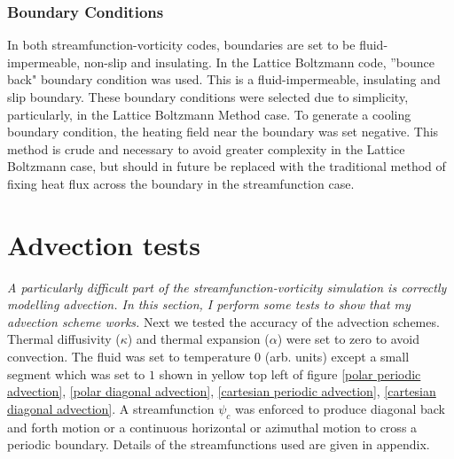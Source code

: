 \documentclass{article}
\begin{document}
\subsubsection*{Boundary Conditions}
In both streamfunction-vorticity codes, boundaries are set to be fluid-impermeable, non-slip and insulating. In the Lattice Boltzmann code, ''bounce back" boundary condition was used. This is a fluid-impermeable, insulating and slip boundary. These boundary conditions were selected due to simplicity, particularly, in the Lattice Boltzmann Method case. To generate a cooling boundary condition, the heating field near the boundary was set negative. This method is crude and necessary to avoid greater complexity in the Lattice Boltzmann case, but should in future be replaced with the traditional method of fixing heat flux across the boundary in the streamfunction case.



\section*{Advection tests}
{\it{A particularly difficult part of the streamfunction-vorticity simulation is correctly modelling advection. In this section, I perform some tests to show that my advection scheme works.}}
\vspace{0.3cm}
\newline
\noindent Next we tested the accuracy of the advection schemes. Thermal diffusivity ($\kappa$) and thermal expansion ($\alpha$) were set to zero to avoid convection. The fluid was set to temperature 0 (arb. units) except a small segment which was set to $1$ shown in yellow top left of figure \ref{polar periodic advection}, \ref{polar diagonal advection}, \ref{cartesian periodic advection}, \ref{cartesian diagonal advection}. A streamfunction $\psi_c$ was enforced to produce diagonal back and forth motion or a continuous horizontal or azimuthal motion to cross a periodic boundary. Details of the streamfunctions used are given in appendix.
\end{document}
